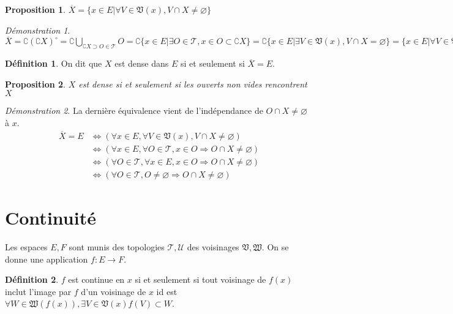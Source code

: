 \documentclass[a4paper, 11pt, french]{book}
\theoremstyle{plain} %
\newtheorem{proposition}{Proposition}
\theoremstyle{definition} %
\newtheorem{definition}{Définition}
\theoremstyle{remark} %
\newtheorem*{demonstration}{Démonstration}
\newcommand{\1}{\mathds{1}}
\newcommand\vide{\varnothing}
\begin{document}
\begin{proposition}
	$\overline{X}=\{x\in E| \forall V\in\mathfrak{V}(x), V\cap X\neq\vide\}$
\end{proposition}

\begin{demonstration}
	$\overline{X}
		=\complement(\complement X)^\circ
		=\complement\bigcup_{\complement X\supset O\in\mathscr{T}}O
		=\complement\{x\in E| \exists O\in\mathscr{T}, x\in O\subset\complement X\}
		=\complement\{x\in E| \exists V\in\mathfrak{V}(x), V\cap X=\vide\}
		=\{x\in E| \forall V\in\mathfrak{V}(x), V\cap X\neq\vide\}$
\end{demonstration}

\begin{definition}
	On dit que $X$ est dense dans $E$ si et seulement si $\overline{X}=E$.
\end{definition}

\begin{proposition}
	$X$ est dense si et seulement si les ouverts non vides rencontrent $X$
\end{proposition}

\begin{demonstration}
	La dernière équivalence vient de l'indépendance de $O\cap X\neq\vide$ à $x$.
	$$
		\begin{aligned}
			\overline{X}=E
				&\Leftrightarrow(\forall x\in E, \forall V\in\mathfrak{V}(x), V\cap X\neq\vide)\\
				&\Leftrightarrow(\forall x\in E, \forall O\in\mathscr{T}, x\in O\Rightarrow O\cap X\neq\vide)\\
				&\Leftrightarrow(\forall O\in\mathscr{T}, \forall x\in E, x\in O\Rightarrow O\cap X\neq\vide)\\
				&\Leftrightarrow(\forall O\in\mathscr{T}, O\neq\vide\Rightarrow O\cap X\neq\vide)
		\end{aligned}
	$$
\end{demonstration}


\section{Continuité}

Les espaces $E, F$ sont munis des topologies $\mathscr{T}, \mathscr{U}$ des voisinages $\mathfrak{V}, \mathfrak{W}$.
On se donne une application $f\colon E\rightarrow F$.

\begin{definition}
	$f$ est continue en $x$ si et seulement si tout voisinage de $f(x)$ inclut l'image par $f$ d'un voisinage de $x$ id est $\forall W\in\mathfrak{W}(f(x)), \exists V\in\mathfrak{V}(x) f(V)\subset W$.
\end{definition}
\end{document}
